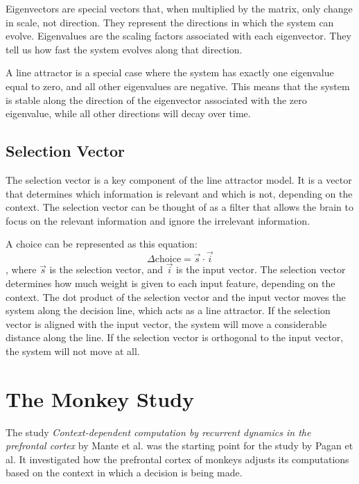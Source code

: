 \documentclass{article}
\begin{document}
Eigenvectors are special vectors that, when multiplied by the matrix, only change in scale, not direction. They represent the directions in which the system can evolve. Eigenvalues are the scaling factors associated with each eigenvector. They tell us how fast the system evolves along that direction. 

A line attractor is a special case where the system has exactly one eigenvalue equal to zero, and all other eigenvalues are negative. This means that the system is stable along the direction of the eigenvector associated with the zero eigenvalue, while all other directions will decay over time.

\subsection{Selection Vector}
The selection vector is a key component of the line attractor model. It is a vector that determines which information is relevant and which is not, depending on the context. The selection vector can be thought of as a filter that allows the brain to focus on the relevant information and ignore the irrelevant information. 

A choice can be represented as this equation:
\[
    \Delta \text{choice} = \vec{s} \cdot \vec{i}
\],
where $\vec{s}$ is the selection vector, and $\vec{i}$ is the input vector. The selection vector determines how much weight is given to each input feature, depending on the context. The dot product of the selection vector and the input vector moves the system along the decision line, which acts as a line attractor. If the selection vector is aligned with the input vector, the system will move a considerable distance along the line. If the selection vector is orthogonal to the input vector, the system will not move at all.


\section{The Monkey Study}
The study \textit{Context-dependent computation by recurrent dynamics in the prefrontal cortex} by Mante et al. was the starting point for the study by Pagan et al. It investigated how the prefrontal cortex of monkeys adjusts its computations based on the context in which a decision is being made. 
\end{document}
